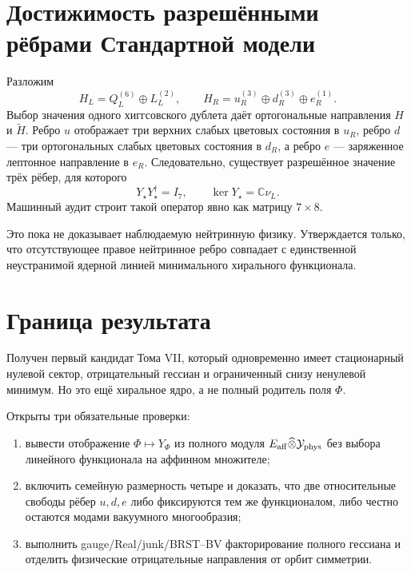 \section{Достижимость разрешёнными рёбрами Стандартной модели}

Разложим
\begin{equation}
 H_L=Q_L^{(6)}\oplus L_L^{(2)},
 \qquad
 H_R=u_R^{(3)}\oplus d_R^{(3)}\oplus e_R^{(1)}.
\end{equation}
Выбор значения одного хиггсовского дублета даёт ортогональные направления
$H$ и $\widetilde H$. Ребро $u$ отображает три верхних слабых цветовых
состояния в $u_R$, ребро $d$ --- три ортогональных слабых цветовых состояния
в $d_R$, а ребро $e$ --- заряженное лептонное направление в $e_R$.
Следовательно, существует разрешённое значение трёх рёбер, для которого
\begin{equation}
 Y_\star Y_\star^\dagger=I_7,
 \qquad
 \ker Y_\star=\mathbb C\nu_L.
 \label{eq:v7-physical-edge-coisometry}
\end{equation}
Машинный аудит строит такой оператор явно как матрицу $7\times8$.

Это пока не доказывает наблюдаемую нейтринную физику. Утверждается только,
что отсутствующее правое нейтринное ребро совпадает с единственной
неустранимой ядерной линией минимального хирального функционала.

\section{Граница результата}

Получен первый кандидат Тома VII, который одновременно имеет стационарный
нулевой сектор, отрицательный гессиан и ограниченный снизу ненулевой минимум.
Но это ещё хиральное ядро, а не полный родитель поля $\Phi$.

Открыты три обязательные проверки:
\begin{enumerate}
 \item вывести отображение $\Phi\mapsto Y_\Phi$ из полного модуля
 $E_{\rm aff}\widehat\otimes\mathcal Y_{\rm phys}$ без выбора линейного
 функционала на аффинном множителе;
 \item включить семейную размерность четыре и доказать, что две относительные
 свободы рёбер $u,d,e$ либо фиксируются тем же функционалом, либо честно
 остаются модами вакуумного многообразия;
 \item выполнить gauge/Real/junk/BRST--BV факторирование полного гессиана и
 отделить физические отрицательные направления от орбит симметрии.
\end{enumerate}

